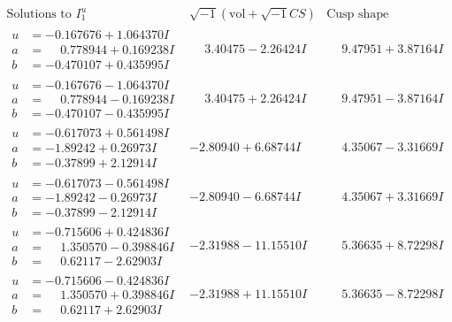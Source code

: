 \documentclass[1p]{elsarticle_modified}
\theoremstyle{definition}
\newcommand{\I}{\sqrt{-1}}
\begin{document}
$$\begin{array}{c|c|c}  
\text{Solutions to }I^u_{1}& \I (\text{vol} + \sqrt{-1}CS) & \text{Cusp shape}\\
 \hline 
\begin{aligned}
u &= -0.167676 + 1.064370 I \\
a &= \phantom{-}0.778944 + 0.169238 I \\
b &= -0.470107 + 0.435995 I\end{aligned}
 & \phantom{-}3.40475 - 2.26424 I & \phantom{-}9.47951 + 3.87164 I \\ \hline\begin{aligned}
u &= -0.167676 - 1.064370 I \\
a &= \phantom{-}0.778944 - 0.169238 I \\
b &= -0.470107 - 0.435995 I\end{aligned}
 & \phantom{-}3.40475 + 2.26424 I & \phantom{-}9.47951 - 3.87164 I \\ \hline\begin{aligned}
u &= -0.617073 + 0.561498 I \\
a &= -1.89242 + 0.26973 I \\
b &= -0.37899 + 2.12914 I\end{aligned}
 & -2.80940 + 6.68744 I & \phantom{-}4.35067 - 3.31669 I \\ \hline\begin{aligned}
u &= -0.617073 - 0.561498 I \\
a &= -1.89242 - 0.26973 I \\
b &= -0.37899 - 2.12914 I\end{aligned}
 & -2.80940 - 6.68744 I & \phantom{-}4.35067 + 3.31669 I \\ \hline\begin{aligned}
u &= -0.715606 + 0.424836 I \\
a &= \phantom{-}1.350570 - 0.398846 I \\
b &= \phantom{-}0.62117 - 2.62903 I\end{aligned}
 & -2.31988 - 11.15510 I & \phantom{-}5.36635 + 8.72298 I \\ \hline\begin{aligned}
u &= -0.715606 - 0.424836 I \\
a &= \phantom{-}1.350570 + 0.398846 I \\
b &= \phantom{-}0.62117 + 2.62903 I\end{aligned}
 & -2.31988 + 11.15510 I & \phantom{-}5.36635 - 8.72298 I \\ \hline\begin{aligned}

\end{aligned}
\end{array}$$
\end{document}

